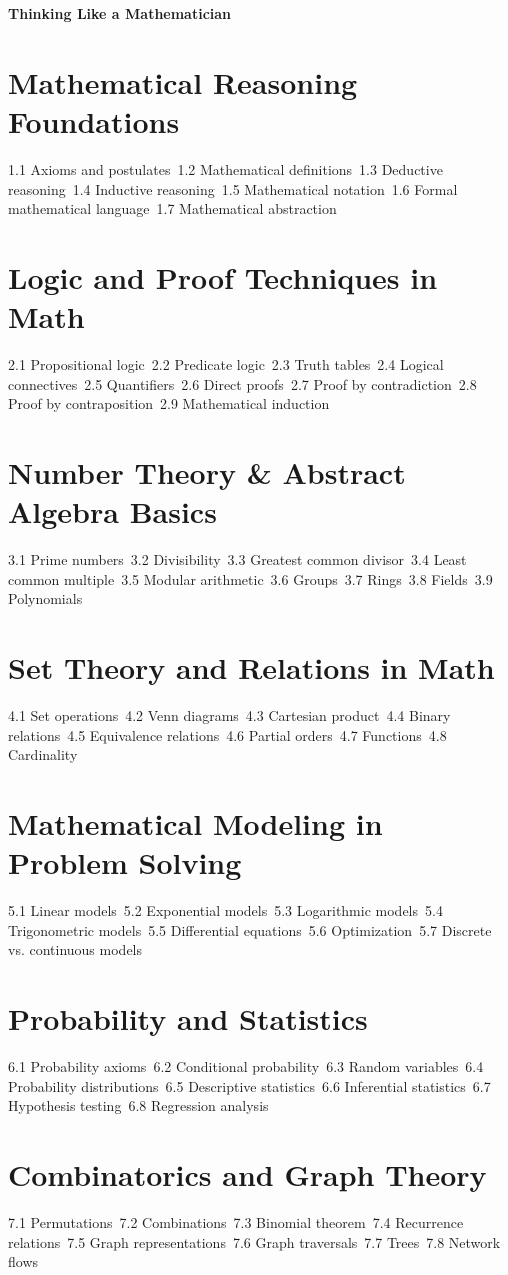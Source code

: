 {\LARGE \bf{Thinking Like a Mathematician}}
\section{Mathematical Reasoning Foundations}
1.1 Axioms and postulates\
1.2 Mathematical definitions\
1.3 Deductive reasoning\
1.4 Inductive reasoning\
1.5 Mathematical notation\
1.6 Formal mathematical language\
1.7 Mathematical abstraction\
\section{Logic and Proof Techniques in Math}
2.1 Propositional logic\
2.2 Predicate logic\
2.3 Truth tables\
2.4 Logical connectives\
2.5 Quantifiers\
2.6 Direct proofs\
2.7 Proof by contradiction\
2.8 Proof by contraposition\
2.9 Mathematical induction\
\section{Number Theory \& Abstract Algebra Basics}
3.1 Prime numbers\
3.2 Divisibility\
3.3 Greatest common divisor\
3.4 Least common multiple\
3.5 Modular arithmetic\
3.6 Groups\
3.7 Rings\
3.8 Fields\
3.9 Polynomials\
\section{Set Theory and Relations in Math}
4.1 Set operations\
4.2 Venn diagrams\
4.3 Cartesian product\
4.4 Binary relations\
4.5 Equivalence relations\
4.6 Partial orders\
4.7 Functions\
4.8 Cardinality\
\section{Mathematical Modeling in Problem Solving}
5.1 Linear models\
5.2 Exponential models\
5.3 Logarithmic models\
5.4 Trigonometric models\
5.5 Differential equations\
5.6 Optimization\
5.7 Discrete vs. continuous models\
\section{Probability and Statistics}
6.1 Probability axioms\
6.2 Conditional probability\
6.3 Random variables\
6.4 Probability distributions\
6.5 Descriptive statistics\
6.6 Inferential statistics\
6.7 Hypothesis testing\
6.8 Regression analysis\
\section{Combinatorics and Graph Theory}
7.1 Permutations\
7.2 Combinations\
7.3 Binomial theorem\
7.4 Recurrence relations\
7.5 Graph representations\
7.6 Graph traversals\
7.7 Trees\
7.8 Network flows\
